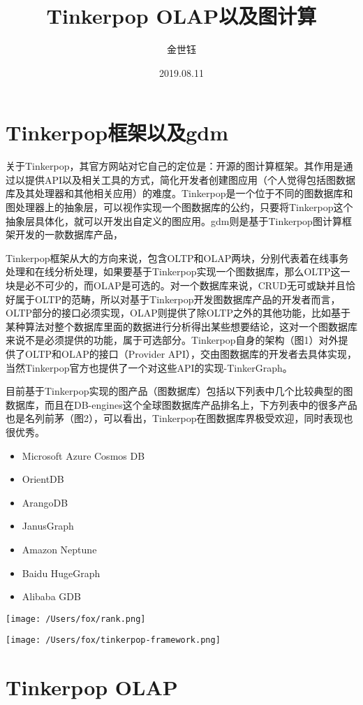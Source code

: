 \documentclass{article}
\title{Tinkerpop OLAP以及图计算}
\author{金世钰}
\date{2019.08.11}
\begin{document}
\maketitle
\section{Tinkerpop框架以及gdm}

关于Tinkerpop，其官方网站对它自己的定位是：开源的图计算框架。其作用是通过以提供API以及相关工具的方式，简化开发者创建图应用（个人觉得包括图数据库及其处理器和其他相关应用）的难度。Tinkerpop是一个位于不同的图数据库和图处理器上的抽象层，可以视作实现一个图数据库的公约，只要将Tinkerpop这个抽象层具体化，就可以开发出自定义的图应用。gdm则是基于Tinkerpop图计算框架开发的一款数据库产品，

Tinkerpop框架从大的方向来说，包含OLTP和OLAP两块，分别代表着在线事务处理和在线分析处理，如果要基于Tinkerpop实现一个图数据库，那么OLTP这一块是必不可少的，而OLAP是可选的。对一个数据库来说，CRUD无可或缺并且恰好属于OLTP的范畴，所以对基于Tinkerpop开发图数据库产品的开发者而言，OLTP部分的接口必须实现，OLAP则提供了除OLTP之外的其他功能，比如基于某种算法对整个数据库里面的数据进行分析得出某些想要结论，这对一个图数据库来说不是必须提供的功能，属于可选部分。Tinkerpop自身的架构（图1）对外提供了OLTP和OLAP的接口（Provider API），交由图数据库的开发者去具体实现，当然Tinkerpop官方也提供了一个对这些API的实现-TinkerGraph。

目前基于Tinkerpop实现的图产品（图数据库）包括以下列表中几个比较典型的图数据库，而且在DB-engines这个全球图数据库产品排名上，下方列表中的很多产品也是名列前茅（图2），可以看出，Tinkerpop在图数据库界极受欢迎，同时表现也很优秀。

\begin{itemize}

\item Microsoft Azure Cosmos DB
\item OrientDB
\item ArangoDB
\item JanusGraph
\item Amazon Neptune
\item Baidu HugeGraph
\item Alibaba GDB
\end{itemize}

\texttt{[image: /Users/fox/rank.png]}


\texttt{[image: /Users/fox/tinkerpop-framework.png]}

\section{Tinkerpop OLAP}
\end{document}
